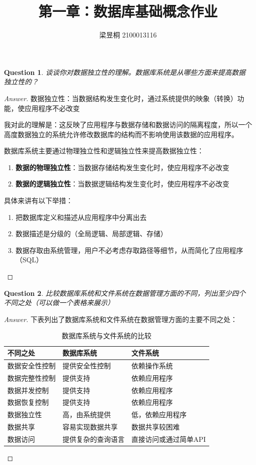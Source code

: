 \documentclass[UTF8,a4paper,10pt]{article}
\title{第一章：数据库基础概念作业}
\author{梁昱桐 2100013116}
\newtheorem{question}{Question}
\newenvironment{solution}
  {\begin{proof}[Answer]}
  {\end{proof}}
\begin{document}
	\maketitle 

	\begin{question}
	谈谈你对数据独立性的理解。数据库系统是从哪些方面来提高数据独立性的？
	\end{question}
	
	\begin{solution}
	数据独立性：当数据结构发生变化时，通过系统提供的映象（转换）功能，使应用程序不必改变

	我对此的理解是：这反映了应用程序与数据存储和数据访问的隔离程度，所以一个高度数据独立的系统允许修改数据库的结构而不影响使用该数据的应用程序。

	数据库系统主要通过物理独立性和逻辑独立性来提高数据独立性：
	\begin{enumerate}
		\item \textbf{数据的物理独立性}：当数据存储结构发生变化时，使应用程序不必改变
		\item \textbf{数据的逻辑独立性}：当数据逻辑结构发生变化时，使应用程序不必改变
	\end{enumerate}

	具体来讲有以下举措：
	\begin{enumerate}
		\item 把数据库定义和描述从应用程序中分离出去
		\item 数据描述是分级的（全局逻辑、局部逻辑、存储）
		\item 数据存取由系统管理，用户不必考虑存取路径等细节，从而简化了应用程序（SQL）
	\end{enumerate}

	\end{solution}

	\begin{question}
	比较数据库系统和文件系统在数据管理方面的不同，列出至少四个不同之处（可以做一个表格来展示）  
	\end{question}

	\begin{solution}
	下表列出了数据库系统和文件系统在数据管理方面的主要不同之处：

	\begin{table}[H]
	\centering
	\caption{数据库系统与文件系统的比较}
	\begin{tabular}{lll}
	\hline
	\textbf{不同之处} & \textbf{数据库系统} & \textbf{文件系统} \\ 
	\hline
	数据安全性控制 & 提供安全性控制 & 依赖操作系统 \\
	数据完整性控制 & 提供支持 & 依赖应用程序 \\ 
	数据并发控制 & 提供支持 & 依赖应用程序 \\
	数据恢复控制 & 提供支持 & 依赖应用程序 \\
	数据独立性 & 高，由系统提供 & 低，依赖应用程序 \\
	数据共享 & 容易实现数据共享 & 数据共享较困难 \\ 
	数据访问 & 提供复杂的查询语言 & 直接访问或通过简单API \\ 
	\hline
	\end{tabular}
	\end{table}
	\end{solution}
\end{document}
